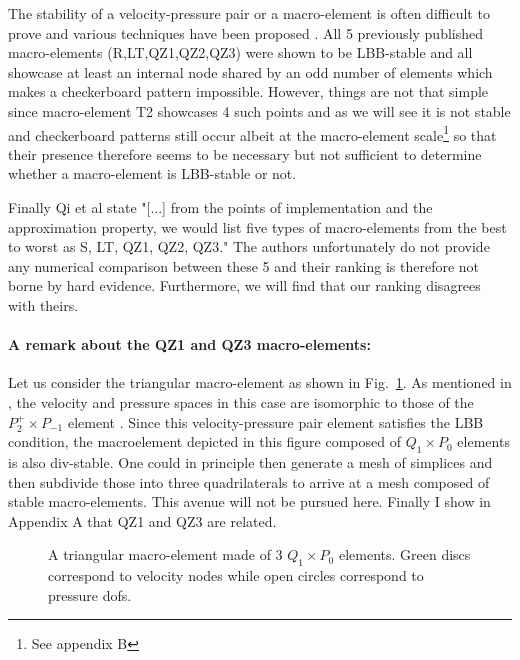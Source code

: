 \documentclass[a4paper,12pt]{article}
\begin{document}
The stability of a velocity-pressure pair or a macro-element is often difficult to prove 
and various techniques have been proposed \cite{bobf13}. 
All 5 previously published macro-elements (R,LT,QZ1,QZ2,QZ3) were shown to be LBB-stable and all showcase at least 
an internal node shared by an odd number of elements which makes a checkerboard pattern impossible. 
However, things are not that simple since macro-element T2 showcases 
4 such points and as we will see it is not stable and checkerboard patterns still occur 
albeit at the macro-element scale\footnote{See appendix B} 
so that their presence therefore seems to be necessary but not sufficient to determine whether 
a macro-element is LBB-stable or not. 

Finally Qi et al \cite{qizh07} state "[...] from the points of implementation and the approximation property, we 
would list five types of macro-elements from the best to worst as S, LT, QZ1, QZ2, QZ3." 
The authors unfortunately do not provide any numerical comparison between these 5 and their 
ranking is therefore not borne by hard evidence. Furthermore, we will find that our ranking disagrees with theirs. 

\paragraph{A remark about the QZ1 and QZ3 macro-elements:}
Let us consider the triangular macro-element as shown in Fig.~\ref{fig:triangle}.
As mentioned in \cite{rovira1992}, 
the velocity and pressure spaces in this case are isomorphic to those
of the $P_2^+ \times P_{-1}$ element \cite{thba25}. Since this velocity-pressure pair 
element satisfies the LBB condition, the macroelement depicted in this figure
composed of $Q_1 \times P_0$ elements is also div-stable.
One could in principle then generate a mesh of simplices and then subdivide those into 
three quadrilaterals to arrive at a mesh composed of stable macro-elements.
This avenue will not be pursued here. Finally I show in Appendix A that QZ1 and QZ3 are related.

\begin{figure}
\centering
{}
\caption{A triangular macro-element made of 3 $Q_1\times P_0$ elements.
Green discs correspond to velocity nodes while open circles 
correspond to pressure dofs.}\label{fig:triangle}
\end{figure}
\end{document}
